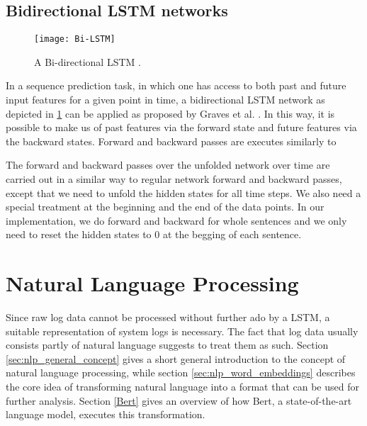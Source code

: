 \subsection{Bidirectional LSTM networks \label{sec:bi-lstm}}
\begin{figure}[h]
  \centering
  \texttt{[image: Bi-LSTM]} \\
  \caption{A Bi-directional LSTM \cite{graves2013speech}.}
  \label{fig:bi-lstm}
\end{figure}
In a sequence prediction task, in which one has access to both past and future input features for a given point in time, a bidirectional LSTM network as depicted in \ref{fig:bi-lstm} can be applied as proposed by Graves et al. \cite{graves2013speech}. In this way, it is possible to make us of past features via the forward state and future features via the backward states. Forward and backward passes are executes similarly to 



The forward and backward passes over the unfolded network over time are carried out in a similar way to regular network forward and backward passes, except that we need to unfold the hidden states for all time steps. We also need a special treatment at the beginning and the end of the data points. In our implementation, we do forward and backward for whole sentences and we only need to reset the hidden states to 0 at the begging of each sentence. 







\section{Natural Language Processing \label{sec:natural-language-processing}}
Since raw log data cannot be processed without further ado by a LSTM, a suitable representation of system logs is necessary. The fact that log data usually consists partly of natural language suggests to treat them as such. Section \ref{sec:nlp_general_concept} gives a short general introduction to the concept of natural language processing, while section \ref{sec:nlp_word_embeddings} describes the core idea of transforming natural language into a format that can be used for further analysis. Section \ref{Bert} gives an overview of how Bert, a state-of-the-art language model, executes this transformation.

